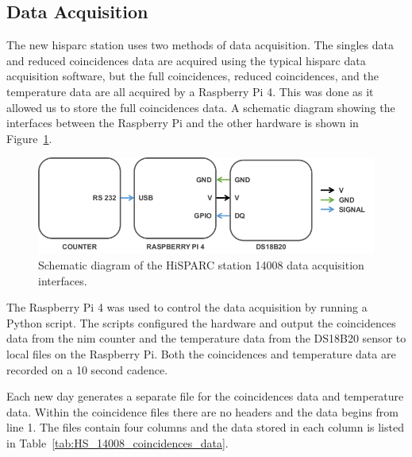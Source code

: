 \subsection{Data Acquisition}
\label{sec:HS14008_data_acqusition}

The new \gls{hisparc} station uses two methods of data acquisition. The singles data and reduced coincidences data are acquired using the typical \gls{hisparc} data acquisition software, but the full coincidences, reduced coincidences, and the temperature data are all acquired by a Raspberry Pi 4. This was done as it allowed us to store the full coincidences data. A schematic diagram showing the interfaces between the Raspberry Pi and the other hardware is shown in Figure~\ref{fig:14008_RP4}.

\begin{figure}[ht!]
	\center
	\includegraphics[width=0.8\columnwidth]{14008_data_acq_config.png}
	\caption{Schematic diagram of the HiSPARC station 14008 data acquisition interfaces.}
	\label{fig:14008_RP4}
\end{figure}


The Raspberry Pi 4 was used to control the data acquisition by running a Python script. The scripts configured the hardware and output the coincidences data from the \gls{nim} counter and the temperature data from the DS18B20 sensor to local files on the Raspberry Pi. Both the coincidences and temperature data are recorded on a 10 second cadence.

Each new day generates a separate file for the coincidences data and temperature data. Within the coincidence files there are no headers and the data begins from line 1. The files contain four columns and the data stored in each column is listed in Table~\ref{tab:HS_14008_coincidences_data}.

